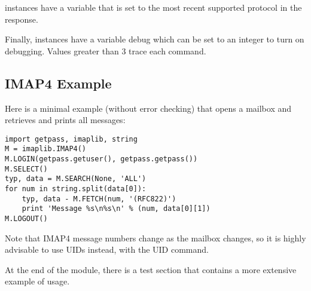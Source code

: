  instances have a variable  that
is set to the most recent supported protocol in the 
response.

Finally,  instances have a variable debug which can be
set to an integer to turn on debugging.  Values greater than 3 trace
each command.


\subsection{IMAP4 Example}
\label{imap4-example}

Here is a minimal example (without error checking) that opens a
mailbox and retrieves and prints all messages:

\begin{verbatim}
import getpass, imaplib, string
M = imaplib.IMAP4()
M.LOGIN(getpass.getuser(), getpass.getpass())
M.SELECT()
typ, data = M.SEARCH(None, 'ALL')
for num in string.split(data[0]):
    typ, data - M.FETCH(num, '(RFC822)')
    print 'Message %s\n%s\n' % (num, data[0][1])
M.LOGOUT()
\end{verbatim}

Note that IMAP4 message numbers change as the mailbox changes, so it
is highly advisable to use UIDs instead, with the UID command.

At the end of the module, there is a test section that contains a more
extensive example of usage.

\begin{seealso}
\end{seealso}
